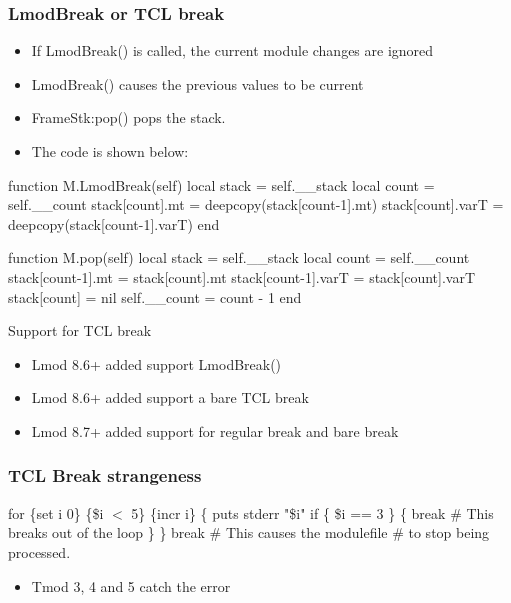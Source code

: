 \documentclass{beamer}
\begin{document}
\begin{frame}[fragile]
    \frametitle{LmodBreak or TCL break}
  \begin{itemize}
    \item If LmodBreak() is called, the current module changes are
      ignored
    \item LmodBreak() causes the previous values to be current
    \item FrameStk:pop() pops the stack.
    \item The code is shown below:
  \end{itemize}
 {\tiny
    \begin{semiverbatim}
function M.LmodBreak(self)
   local stack           = self.\_\_stack
   local count           = self.\_\_count
   stack[count].mt       = deepcopy(stack[count-1].mt)
   stack[count].varT     = deepcopy(stack[count-1].varT)
end

function M.pop(self)
   local stack           = self.\_\_stack
   local count           = self.\_\_count
   stack[count-1].mt     = stack[count].mt
   stack[count-1].varT   = stack[count].varT
   stack[count]          = nil
   self.__count          = count - 1
end
    \end{semiverbatim}
}
\end{frame}

\begin{frame}{Support for TCL break}
  \begin{itemize}
    \item Lmod 8.6+ added support LmodBreak()
    \item Lmod 8.6+ added support a bare TCL break
    \item Lmod 8.7+ added support for regular break and bare break
  \end{itemize}
\end{frame}

\begin{frame}[fragile]
    \frametitle{TCL Break strangeness}
 {\small
   \begin{semiverbatim}
for \{set i 0\} \{\$i $<$ 5\} \{incr i\} \{
  puts stderr "\$i"
  if \{ \$i == 3 \} \{
      break  # This breaks out of the loop
  \}
\}
break # This causes the modulefile
      # to stop being processed.       
    \end{semiverbatim}
  \begin{itemize}
    \item Tmod 3, 4 and 5 catch the error
  \end{itemize}
}
\end{frame}
\end{document}
